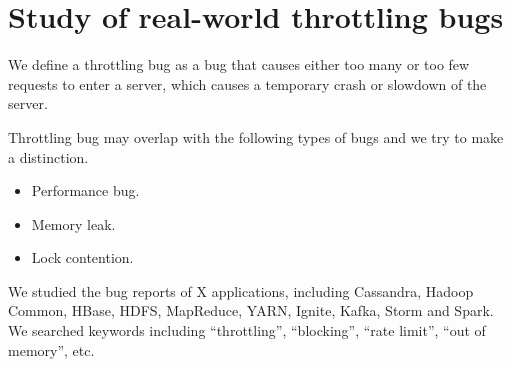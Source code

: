 \section{Study of real-world throttling bugs}

We define a throttling bug as a bug that causes either too many
or too few requests to enter a server, which causes a temporary
crash or slowdown of the server. 

Throttling bug may overlap with the following types of bugs and
we try to make a distinction. 

\begin{itemize}

\item Performance bug.

\item Memory leak.

\item Lock contention.

\end{itemize}



We studied the bug reports of X applications, including Cassandra, Hadoop Common, HBase, HDFS, MapReduce, YARN, Ignite, Kafka, Storm and Spark.
We searched keywords including ``throttling'', ``blocking'', ``rate limit'', ``out of memory'', etc.